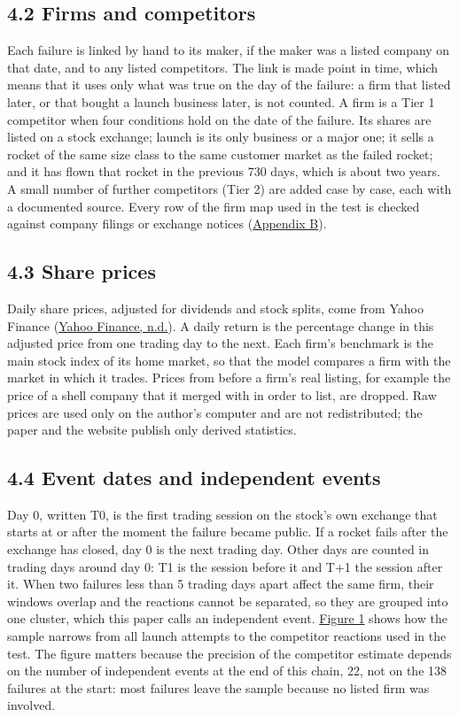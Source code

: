 \documentclass[12pt,a4paper]{article}
\begin{document}
\subsection*{4.2 Firms and competitors}
Each failure is linked by hand to its maker, if the maker was a listed company on that date, and to any listed competitors. The link is made point in time, which means that it uses only what was true on the day of the failure: a firm that listed later, or that bought a launch business later, is not counted. A firm is a Tier 1 competitor when four conditions hold on the date of the failure. Its shares are listed on a stock exchange; launch is its only business or a major one; it sells a rocket of the same size class to the same customer market as the failed rocket; and it has flown that rocket in the previous 730 days, which is about two years. A small number of further competitors (Tier 2) are added case by case, each with a documented source. Every row of the firm map used in the test is checked against company filings or exchange notices (\hyperlink{apx-b}{Appendix B}).

\subsection*{4.3 Share prices}
Daily share prices, adjusted for dividends and stock splits, come from Yahoo Finance (\hyperlink{ref-yahoo}{Yahoo Finance, n.d.}). A daily return is the percentage change in this adjusted price from one trading day to the next. Each firm's benchmark is the main stock index of its home market, so that the model compares a firm with the market in which it trades. Prices from before a firm's real listing, for example the price of a shell company that it merged with in order to list, are dropped. Raw prices are used only on the author's computer and are not redistributed; the paper and the website publish only derived statistics.

\subsection*{4.4 Event dates and independent events}
Day 0, written T0, is the first trading session on the stock's own exchange that starts at or after the moment the failure became public. If a rocket fails after the exchange has closed, day 0 is the next trading day. Other days are counted in trading days around day 0: T\textminus{}1 is the session before it and T+1 the session after it. When two failures less than 5 trading days apart affect the same firm, their windows overlap and the reactions cannot be separated, so they are grouped into one cluster, which this paper calls an independent event. \hyperlink{fig-sample}{Figure 1} shows how the sample narrows from all launch attempts to the competitor reactions used in the test. The figure matters because the precision of the competitor estimate depends on the number of independent events at the end of this chain, 22, not on the 138 failures at the start: most failures leave the sample because no listed firm was involved.
\end{document}
